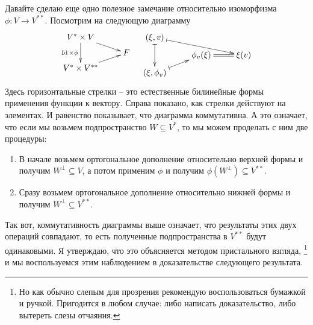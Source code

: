 Давайте сделаю еще одно полезное замечание относительно изоморфизма $\phi\colon V\to V^{**}$.
Посмотрим на следующую диаграмму
\[
\xymatrix@R=5pt{
	{V^*\times V}\ar[dd]_{\Identity\times \phi}\ar[rd]&{}\\
	{}&{F}\\
	{V^*\times V^{**}}\ar[ru]&{}\\
}
\quad
\xymatrix@R=5pt{
	{(\xi, v)}\ar@{|->}[dd]\ar@{|->}[rrd]&{}&{}\\
	{}&{\phi_v(\xi)}\ar@{=}[r]&{\xi(v)}\\
	{(\xi,\phi_v)}\ar@{|->}[ru]&{}&{}\\
}
\]
Здесь горизонтальные стрелки -- это естественные билинейные формы применения функции к вектору.
Справа показано, как стрелки действуют на элементах.
И равенство показывает, что диаграмма коммутативна.
А это означает, что если мы возьмем подпространство $W\subseteq V^*$, то мы можем проделать с ним две процедуры: 
\begin{enumerate}
\item В начале возьмем ортогональное дополнение относительно верхней формы и получим $W^\bot \subseteq V$, а потом применим $\phi$ и получим $\phi(W^\bot)\subseteq V^{**}$.

\item Сразу возьмем ортогональное дополнение относительно нижней формы и получим $W^\bot \subseteq V^{**}$.
\end{enumerate}
Так вот, коммутативность диаграммы выше означает, что результаты этих двух операций совпадают, то есть полученные подпространства в $V^{**}$ будут одинаковыми.
Я утверждаю, что это объясняется методом пристального взгляда,%
\footnote{Но как обычно слепым для прозрения рекомендую воспользоваться бумажкой и ручкой.
Пригодится в любом случае: либо написать доказательство, либо вытереть слезы отчаяния.}
и мы воспользуемся этим наблюдением в доказательстве следующего результата.

